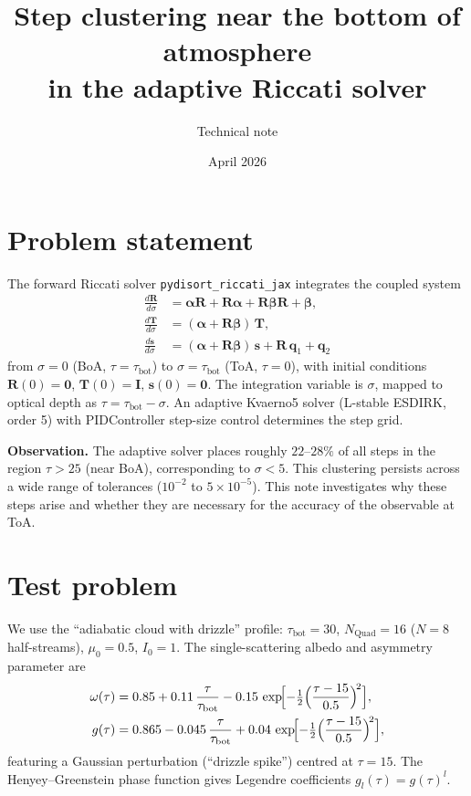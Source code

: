 \documentclass[11pt]{article}
\title{Step clustering near the bottom of atmosphere\\
  in the adaptive Riccati solver}
\author{Technical note}
\date{April 2026}
\newcommand{\bR}{\mathbf{R}}
\newcommand{\bT}{\mathbf{T}}
\newcommand{\bs}{\mathbf{s}}
\newcommand{\bI}{\mathbf{I}}
\newcommand{\balpha}{\boldsymbol{\alpha}}
\newcommand{\bbeta}{\boldsymbol{\beta}}
\begin{document}
\maketitle

\section{Problem statement}

The forward Riccati solver \texttt{pydisort\_riccati\_jax} integrates
the coupled system
\begin{align}
  \frac{d\bR}{d\sigma}
    &= \balpha\bR + \bR\balpha + \bR\bbeta\bR + \bbeta,
    \label{eq:riccati}\\
  \frac{d\bT}{d\sigma}
    &= (\balpha + \bR\bbeta)\,\bT,
    \label{eq:T}\\
  \frac{d\bs}{d\sigma}
    &= (\balpha + \bR\bbeta)\,\bs + \bR\,\mathbf{q}_1 + \mathbf{q}_2
    \label{eq:s}
\end{align}
from $\sigma=0$ (BoA, $\tau=\tau_\mathrm{bot}$) to $\sigma=\tau_\mathrm{bot}$
(ToA, $\tau=0$), with initial conditions $\bR(0)=\mathbf{0}$,
$\bT(0)=\bI$, $\bs(0)=\mathbf{0}$.  The integration variable is
$\sigma$, mapped to optical depth as $\tau = \tau_\mathrm{bot}-\sigma$.
An adaptive Kvaerno5 solver (L-stable ESDIRK, order 5) with
PIDController step-size control determines the step grid.

\medskip
\noindent\textbf{Observation.}
The adaptive solver places roughly $22\text{--}28\%$ of all
steps in the region $\tau>25$ (near BoA), corresponding to
$\sigma<5$.  This clustering persists across a wide range of
tolerances ($10^{-2}$ to $5\times10^{-5}$).  This note
investigates why these steps arise and whether they are
necessary for the accuracy of the observable at ToA.


\section{Test problem}

We use the ``adiabatic cloud with drizzle'' profile:
$\tau_\mathrm{bot}=30$, $N_\mathrm{Quad}=16$ ($N=8$ half-streams),
$\mu_0=0.5$, $I_0=1$.  The single-scattering albedo and asymmetry
parameter are
\begin{align}
  \omega(\tau) &= 0.85 + 0.11\,\frac{\tau}{\tau_\mathrm{bot}}
    - 0.15\,\exp\!\Bigl[-\tfrac{1}{2}\Bigl(\frac{\tau-15}{0.5}\Bigr)^{\!2}\Bigr],\\
  g(\tau) &= 0.865 - 0.045\,\frac{\tau}{\tau_\mathrm{bot}}
    + 0.04\,\exp\!\Bigl[-\tfrac{1}{2}\Bigl(\frac{\tau-15}{0.5}\Bigr)^{\!2}\Bigr],
\end{align}
featuring a Gaussian perturbation (``drizzle spike'') centred at
$\tau=15$.  The Henyey--Greenstein phase function gives
Legendre coefficients $g_l(\tau) = g(\tau)^l$.
\end{document}
